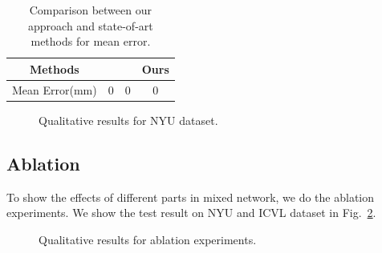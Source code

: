 \documentclass[journal,comsoc]{IEEEtran}
\let\MYoriglatexcaption\caption
\renewcommand{\caption}[2][\relax]{\MYoriglatexcaption[#2]{#2}}
\begin{document}
\begin{table}[htbp]\footnotesize
\centering
    \begin{tabular}{|c|c|c|c|}
    \hline
    Methods        &\cite{oberweger2015hands} &\cite{zhou2016model} &Ours\\
    \hline
    Mean Error(mm) &0                      &0                       &0\\
    \hline
    \end{tabular}
\vspace{1em}
\caption{Comparison between our approach and state-of-art methods for mean error.}
\label{tab:mean error ICVL}
\end{table}

\begin{figure}[t]\footnotesize
\centering
    \caption{Qualitative results for NYU dataset.}
    \label{fig:Qualitative result NYU}
\end{figure}
\subsection{Ablation}\label{sec:ablation}
To show the effects of different parts in mixed network, we do the ablation experiments. We show the test result on NYU and ICVL dataset in Fig.~\ref{fig:Qualitative result ablation}.

\begin{figure}[t]\footnotesize
\centering
    \caption{Qualitative results for ablation experiments.}
    \label{fig:Qualitative result ablation}
\end{figure}
\end{document}
